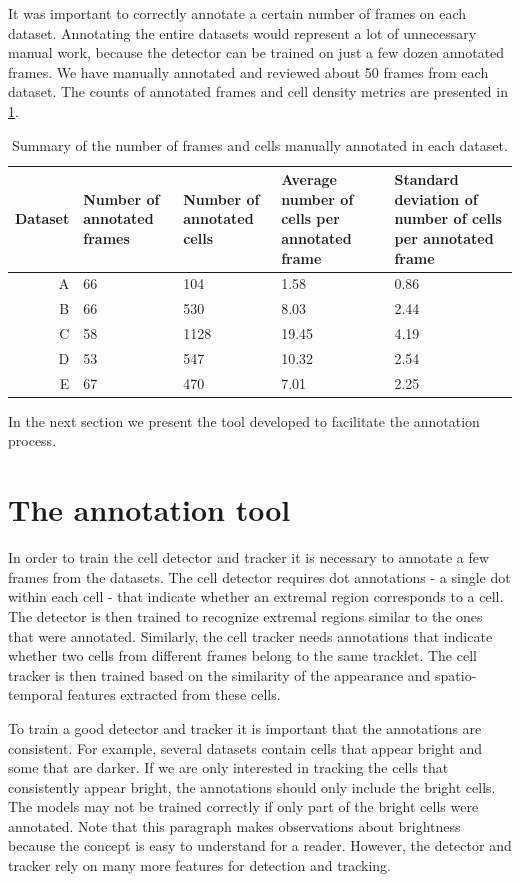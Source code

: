	It was important to correctly annotate a certain number of frames on each dataset. Annotating the entire datasets would represent a lot of unnecessary manual work, because the detector can be trained on just a few dozen annotated frames. We have manually annotated and reviewed about 50 frames from each dataset. The counts of annotated frames and cell density metrics are presented in \cref{tab:results_data_count}.

	\begin{table}[h]
		\centering
		\begin{tabular}{rp{3cm}p{3cm}p{3cm}p{4cm}}
			Dataset & Number of annotated frames & Number of annotated cells & Average number of cells per annotated frame & Standard deviation of number of cells per annotated frame \\
		\hline
			      A &    66   &   104 &   1.58  &    0.86  \\
			      B &    66   &   530 &   8.03  &    2.44  \\
			      C &    58   &  1128 &  19.45  &    4.19 \\
			      D &    53   &   547 &  10.32  &    2.54 \\
			      E &    67   &   470 &   7.01  &    2.25 
		\end{tabular} 
		\caption{
			Summary of the number of frames and cells manually annotated in each dataset.}
		\label{tab:results_data_count}
	\end{table}
	
	In the next section we present the tool developed to facilitate the annotation process.

    \section{The annotation tool}
    \label{sec:data_tool}
    	In order to train the cell detector and tracker it is necessary to annotate a few frames from the datasets. The cell detector requires dot annotations - a single dot within each cell - that indicate whether an extremal region corresponds to a cell. The detector is then trained to recognize extremal regions similar to the ones that were annotated. Similarly, the cell tracker needs annotations that indicate whether two cells from different frames belong to the same tracklet. The cell tracker is then trained based on the similarity of the appearance and spatio-temporal features extracted from these cells.
    	
    	To train a good detector and tracker it is important that the annotations are consistent. For example, several datasets contain cells that appear bright and some that are darker. If we are only interested in tracking the cells that consistently appear bright, the annotations should only include the bright cells. The models may not be trained correctly if only part of the bright cells were annotated. Note that this paragraph makes observations about brightness because the concept is easy to understand for a reader. However, the detector and tracker rely on many more features for detection and tracking.
	
